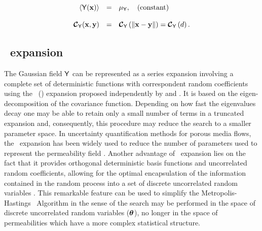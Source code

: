 \begin{equation}
 \begin{array}{rcl}
    \langle {\mathsf{Y}\!\left(\mathbf{x}\right)} \rangle &=& {\mu_{\mathsf{Y}}},\quad \mbox{(constant)}\\ \\
    {\boldmath{\mbox{$\mathcal{C}$}}}_{\mathsf{Y}}(\mathbf{x}, \mathbf{y})   &=& {\boldmath{\mbox{$\mathcal{C}$}}}_{\mathsf{Y}}\left(\lVert \mathbf{x} - \mathbf{y} \rVert \right) = {\boldmath{\mbox{$\mathcal{C}$}}}_{\mathsf{Y}}\left(d\right).
 \end{array}
\end{equation}



\subsection{\KL\ expansion}

The Gaussian field $\mathsf{Y}$ can be represented as a series expansion involving a complete set of deterministic functions with correspondent random coefficients using the \KL\ (\kl) expansion proposed independently by \cite{karhunen46} and \cite{loeve55}.
It is based on the eigen-decomposition of the covariance function.
Depending on how fast the eigenvalues decay one may be able to  retain only a small number of terms in a truncated expansion and, consequently, this procedure may reduce the search to a smaller parameter space.
In uncertainty quantification methods for porous media flows, the \kl\ expansion has been widely used to reduce the number of parameters used to represent the permeability field \citep{efendiev05,efendiev2006,das10,mondal10,ginting11,ginting12}.
Another advantage of \kl\ expansion lies on the fact that it provides orthogonal deterministic basis functions and uncorrelated random coefficients, allowing for the optimal encapsulation of the information contained in the random process into a set of discrete uncorrelated random variables \citep{GhanemSpanos}.
This remarkable feature can be used to simplify the Metropolis-Hastings \mcmc\ Algorithm in the sense of the search may be performed in the space of discrete uncorrelated random variables ($\boldsymbol{\theta}$), no longer in the space of permeabilities which have a more complex statistical structure.
